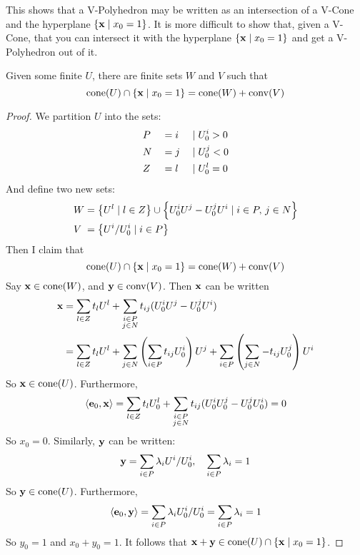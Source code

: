 This shows that a V-Polyhedron may be written as an intersection of a V-Cone and the hyperplane $\left\{\mathbf{x}\;|\; x_0 = 1\right\}$.  It is more difficult to show that, given a V-Cone, that you can intersect it with the hyperplane $\left\{\mathbf{x}\;|\; x_0 = 1\right\}$ and get a V-Polyhedron out of it.

\begin{Prop}\label{vcone_to_vpoly}
	Given some finite $U$, there are finite sets $W$ and $V$ such that
	\[\operatorname{cone}(U) \cap \left\{\mathbf{x}\;|\; x_0 = 1\right\} = \operatorname{cone}(W) + \operatorname{conv}(V) \]
\end{Prop}

\begin{proof}
	We partition $U$ into the sets:
	\begin{alignat*}{3}
		 & P &  & = i & \;|\; & U^i_{0} > 0 \\
		 & N &  & = j & \;|\; & U^j_{0} < 0 \\
		 & Z &  & = l & \;|\; & U^l_{0} = 0
	\end{alignat*}
	And define two new sets:
	\begin{align*}
		W   & = \left\{U^l \;|\; l \in Z\right\} \cup \left\{U^i_{0} U^j - U^j_{0} U^i \;|\; i\in P,\, j\in N\right\} \\
		V\; & = \left\{U^i/U^i_{0} \;|\; i \in P\right\}
	\end{align*}
	Then I claim that
	\[ \operatorname{cone}(U) \cap \left\{\mathbf{x}\;|\; x_0 = 1\right\} = \operatorname{cone}(W) + \operatorname{conv}(V) \]
	Say $\mathbf{x} \in\operatorname{cone}(W)$, and $\mathbf{y}\in\operatorname{conv}(V)$.  Then $\mathbf{x}$ can be written
	\begin{align*}
		\mathbf{x} & = \sum_{l\in Z}t_l U^l + \sum_{\substack{i\in P \\ j\in N}} t_{ij}(U^i_{0} U^j - U^j_{0} U^i)      \\
		   & = \sum_{l\in Z}t_l U^l + \sum_{j\in N} \left(\sum_{i\in P} t_{ij}U^i_{0}\right) U^j
		+ \sum_{i\in P} \left(\sum_{j\in N} -t_{ij}U^j_{0}\right) U^i
	\end{align*}
	So $\mathbf{x} \in \operatorname{cone}(U)$.  Furthermore,
	\[ \left\langle \mathbf{e}_0, \mathbf{x} \right\rangle = \sum_{l\in Z}t_l U^l_{0} + \sum_{\substack{i\in P \\ j\in N}} t_{ij}(U^i_{0} U^j_{0} - U^j_{0} U^i_{0}) = 0\]
	So $x_0 = 0$.  Similarly, $\mathbf{y}$ can be written:
	\[ \mathbf{y} = \sum_{i\in P} \lambda_i U^i/U^i_{0},\quad\sum_{i\in P}\lambda_i = 1 \]
	So $\mathbf{y} \in \operatorname{cone}(U)$.  Furthermore,
	\[ \left\langle \mathbf{e}_0, \mathbf{y} \right\rangle = \sum_{i\in P} \lambda_i U^i_{0}/U^i_{0} = \sum_{i\in P} \lambda_i  = 1\]
	So $y_0 = 1$ and $x_0 + y_0 = 1$.  It follows that $\mathbf{x} + \mathbf{y} \in \operatorname{cone}(U) \cap \left\{\mathbf{x}\;|\; x_0 = 1\right\}$.


\end{proof}

